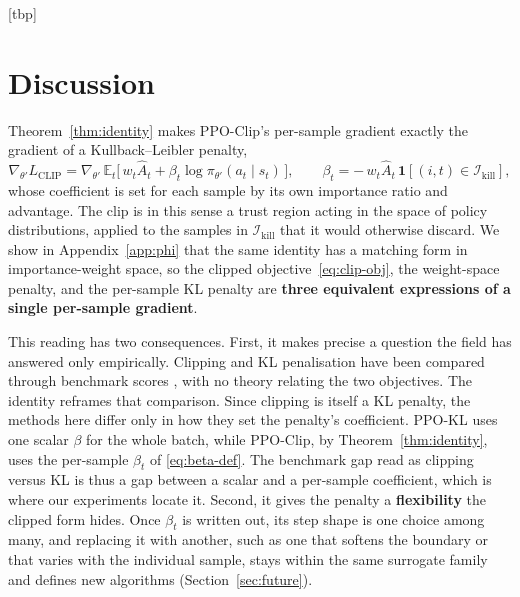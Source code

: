 \documentclass{article}
\makeatletter
\newcommand{\indicator}{\mathbf{1}}
\renewenvironment{table}
  {\setlength{\abovecaptionskip}{8\p@}%
   \setlength{\belowcaptionskip}{\z@}%
   \@float{table}}
  {\end@float}
\makeatother
\begin{document}
\begin{table}[tbp]
  \centering
  
  \caption{Final return (mean $\pm$ std over $5$ seeds, last $10\%$ of
  training). PPO-Clip and per-sample PPO-KL are identical on every task; the
  scalar-$\beta$ variants fall behind on the high-dimensional tasks.}
  \label{tab:final-returns}
\end{table}


\section{Discussion}
\label{sec:conclusion}


Theorem~\ref{thm:identity} makes PPO-Clip's per-sample gradient exactly
the gradient of a Kullback--Leibler penalty,
\[
\nabla_{\theta'} L_{\mathrm{CLIP}} = \nabla_{\theta'}\,\mathbb{E}_t\!\bigl[\,w_t \hat{A}_t + \beta_t \log \pi_{\theta'}(a_t\mid s_t)\,\bigr],
\qquad
\beta_t = -\,w_t \hat{A}_t \,\indicator\!\left[(i,t)\in\mathcal{I}_{\mathrm{kill}}\right],
\]
whose coefficient is set for each sample by its own importance ratio and
advantage. The clip is in this sense a trust region acting in the space of
policy distributions, applied to the samples in
$\mathcal{I}_{\mathrm{kill}}$ that it would otherwise discard. We show in
Appendix~\ref{app:phi} that the same identity has a matching form in
importance-weight space, so the clipped objective~\eqref{eq:clip-obj}, the
weight-space penalty, and the per-sample KL penalty are \textbf{three
equivalent expressions of a single per-sample gradient}.

This reading has two consequences. First, it makes precise a question the
field has answered only empirically. Clipping and KL penalisation have been
compared through benchmark scores \citep{schulman2017ppo,
engstrom2020implementation, ilyas2020closer, andrychowicz2021matters,
hsu2020revisiting, sun2022espo}, with no theory relating the two
objectives. The identity reframes that comparison. Since clipping is itself a KL
penalty, the methods here differ only in how they set the penalty's
coefficient. PPO-KL uses one scalar $\beta$ for the whole batch, while
PPO-Clip, by Theorem~\ref{thm:identity}, uses the per-sample $\beta_t$ of
\eqref{eq:beta-def}. The benchmark gap read as clipping versus KL is thus a
gap between a scalar and a per-sample coefficient, which is where our
experiments locate it.
Second, it gives the penalty a \textbf{flexibility} the clipped form
hides. Once $\beta_t$ is written out, its step shape is one choice among
many, and replacing it with another, such as one that softens the boundary
or that varies with the individual sample, stays within the same surrogate
family and defines new algorithms (Section~\ref{sec:future}).
\end{document}
